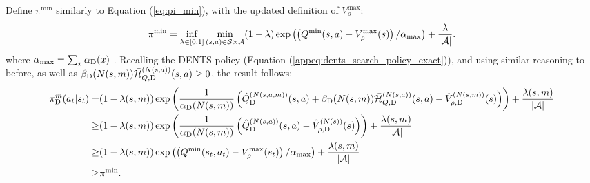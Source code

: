 \begin{proofoutline}
            Define $\pi^{\min}$ similarly to Equation (\ref{eq:pi_min}), with the updated definition of $V_\rho^{\max}$: 
            \begin{align}
                \pi^{\min} = \inf_{\lambda\in[0,1]} \min_{(s,a)\in\mathcal{S}\times\mathcal{A}} (1-\lambda) \exp\left(\left(Q^{\min}(s,a)-V_\rho^{\max}(s)\right)/\alpha_{\max}\right) + \frac{\lambda}{|\mathcal{A}|}. \label{eq:pi_min_dents}
            \end{align}
            where $\alpha_{\max}=\sum_x {\alpha_{{\textnormal{D}}}}(x)$ . Recalling the DENTS policy (Equation (\ref{appeq:dents_search_policy_exact})), and using similar reasoning to before, as well as ${\beta_{{\textnormal{D}}}}(N(s,m)){\bar{\mathcal{H}}^{(N(s,a))}_{Q,{\textnormal{D}}}}(s,a) \geq 0$, the result follows:
            \begin{align}
                {\pi^{m}_{{\textnormal{D}}}}(a_t|s_t) 
                    =& (1-\lambda(s,m))\exp\left(\frac{1}{{\alpha_{{\textnormal{D}}}}(N(s,m))}
                        \left({\hat{Q}^{(N(s,a,m))}_{{\textnormal{D}}}}(s,a) 
                        + {\beta_{{\textnormal{D}}}}(N(s,m)){\bar{\mathcal{H}}^{(N(s,a))}_{Q,{\textnormal{D}}}}(s,a) 
                        - {\hat{V}^{(N(s,m))}_{\rho,{\textnormal{D}}}}(s) \right)\right) 
                        + \frac{\lambda(s,m)}{|\mathcal{A}|} \\
                    \geq& (1-\lambda(s,m))\exp\left(\frac{1}{{\alpha_{{\textnormal{D}}}}(N(s,m))}
                        \left({\hat{Q}^{(N(s,a))}_{{\textnormal{D}}}}(s,a) - {\hat{V}^{(N(s))}_{\rho,{\textnormal{D}}}}(s) \right)\right) 
                        + \frac{\lambda(s,m)}{|\mathcal{A}|} \\
                    \geq& (1-\lambda(s,m))\exp\left(\left(Q^{\min}(s_t,a_t)-V_\rho^{\max}(s_t)\right)/\alpha_{\max}\right) 
                        + \frac{\lambda(s,m)}{|\mathcal{A}|} \\
                    \geq& \pi^{\min}.
            \end{align}
        \end{proofoutline}






    
    
